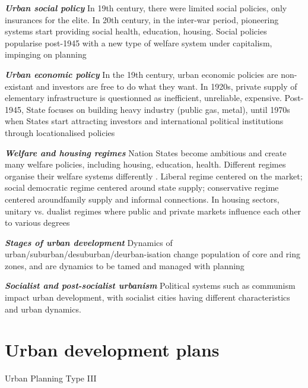 \documentclass{article}
\newcommand{\bisection}[1]{\textbf{\textit{#1}}}
\newcommand{\alignedmarginpar}[1]{%
        \marginpar{\raggedright\small #1}
    }
\begin{document}
\bisection{Urban social policy} In 19th century, there were limited social policies, only insurances for the elite. In 20th century, in the inter-war period, pioneering systems start providing social health, education, housing. Social policies popularise post-1945 with a new type of welfare system under capitalism, impinging on planning

\bisection{Urban economic policy} In the 19th century, urban economic policies are non-existant and investors are free to do what they want. In 1920s, private supply of elementary infrastructure is questionned as inefficient, unreliable, expensive. Post-1945, State focuses on building heavy industry (public gas, metal), until 1970s when States start attracting investors and international political institutions through locationalised policies\alignedmarginpar{UN City Vienna}

\bisection{Welfare and housing regimes} Nation States become ambitious and create many welfare policies, including housing, education, health. Different regimes organise their welfare systems differently\alignedmarginpar{Welfare triangle}. Liberal regime centered on the market; social democratic regime centered around state supply; conservative regime centered aroundfamily supply and informal connections. In housing sectors, unitary vs. dualist regimes where public and private markets influence each other to various degrees

\bisection{Stages of urban development} Dynamics of urban/suburban/desuburban/deurban-isation change population of core and ring zones, and are dynamics to be tamed and managed with planning

\bisection{Socialist and post-socialist urbanism} Political systems such as communism impact urban development, with socialist cities having different characteristics and urban dynamics.

\pagebreak
\section{Urban development plans}

Urban Planning Type III 

\bisection{}

\bisection{}

\bisection{}

\bisection{}

\bisection{}
\end{document}
